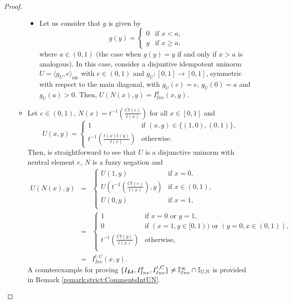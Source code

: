 \begin{proof}
\begin{enumerate}[label=(\roman*)]
\begin{itemize}
\begin{itemize}
				\item Let us consider that $g$ is given by
				$$
				g(y)
				=
				\left\{ \begin{array}{ll}
					0 &  \text{if }  x < a, \\
					y &  \text{if } x \geq a,
				\end{array}
				\right.
				$$
				where $a \in (0,1)$ (the case when $g(y)=y$ if and only if $x>a$ is analogous). In this case, consider a disjuntive idempotent uninorm $U=\langle g_U,e\rangle_{\text{ide}}$ with $e \in (0,1)$ and $g_U :[0,1] \to [0,1]$, symmetric with respect to the main
				diagonal, with $g_U(e) = e$, $g_U(0)=a$ and $g_U(a)>0$. Then, $U(N(x),y)=I_{Inv}^{g}(x,y)$.	
			\end{itemize}
			\item  Let $e \in (0,1)$, $N(x)=t^{-1}\left(\frac{Ct(e)}{t(x)}\right)$ for all $x \in [0,1]$ and
			$$U(x,y)
			=
			\left\{ \begin{array}{ll}
				1 & \text{if } (x,y) \in \{(1,0),(0,1)\}, \\
				t^{-1} \left(\frac{t(x)t(y)}{t(e)}\right) & \text{otherwise.}
			\end{array} \right.$$
			Then, is straightforward to see that $U$ is a disjunctive uninorm with neutral element $e$, $N$ is a fuzzy negation and
			\begin{eqnarray*}
				U(N(x),y)
				&=&
				\left\{ \begin{array}{ll}
					U(1,y) &  \text{if }  x=0, \\
					U(t^{-1}\left(\frac{Ct(e)}{t(x)}\right),y) &  \text{if } x \in (0,1),\\
					U(0,y) &  \text{if } x=1,\\
				\end{array}
				\right. \\
				&=&
				\left\{ \begin{array}{ll}
					1 &  \text{if }  x=0 \text{ or } y=1, \\
					0 &  \text{if } (x=1, y \in [0,1)) \text{ or } (y=0, x \in (0,1)),\\
					t^{-1}\left(\frac{Ct(y)}{t(x)}\right) &  \text{otherwise},\\
				\end{array}
				\right. \\
				&=&I_{Inv}^{t,C}(x,y).
			\end{eqnarray*}
		A counterexample for proving  $\{I_{\bm{Lt}}, I_{Inv}^{g},I_{Inv}^{t,C}\} \not = \mathbb{I}^{\infty}_{Inv} \cap \mathbb{I}_{\mathbb{U},\mathbb{N}}$ is provided in Remark \ref{remark:strict:CommentsIntUN}.

\end{itemize}
\end{enumerate}
\end{proof}
